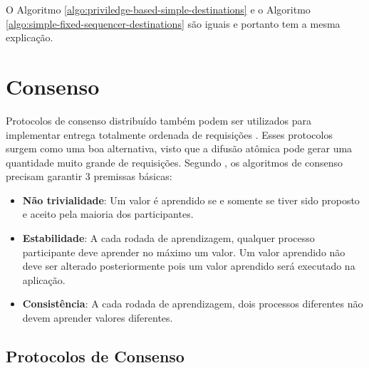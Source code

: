 

O Algoritmo \ref{algo:priviledge-based-simple-destinations} e o Algoritmo \ref{algo:simple-fixed-sequencer-destinations} são iguais e portanto tem a mesma explicação.

\section{Consenso}
\label{sec:consenso}

Protocolos de consenso distribuído também podem ser utilizados para implementar entrega totalmente ordenada de requisições \cite{conf/dsn/EkwallS06, MilosevicHutleSchiper2011}. Esses protocolos surgem como uma boa alternativa, visto que a
difusão atômica 
pode gerar
uma quantidade muito grande de requisições.
Segundo \textcite{lamport2001paxos}, os algoritmos de consenso precisam garantir 3 premissas básicas:

\begin{itemize}
\item \textbf{Não trivialidade}: Um valor é aprendido se e somente se tiver sido proposto e aceito pela maioria dos participantes.

\item \textbf{Estabilidade}: A cada rodada de aprendizagem, qualquer processo participante deve aprender no máximo um valor. Um valor aprendido não deve ser alterado posteriormente pois um valor aprendido será executado na aplicação.

\item \textbf{Consistência}: A cada rodada de aprendizagem, dois processos diferentes não devem aprender valores diferentes.
\end{itemize}

\subsection{Protocolos de Consenso}

